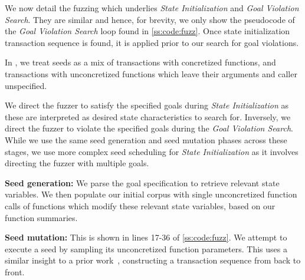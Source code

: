 We now detail the fuzzing  which underlies \textit{State Initialization} and \textit{Goal Violation Search}.
They are similar and hence, for brevity, we only show 
the pseudocode of the \textit{Goal Violation Search} loop found in \autoref{ss:code:fuzz}.
Once state initialization transaction sequence is found, it is applied prior to our search for goal violations.

In \spoilsport, we treat seeds as a mix of transactions with concretized functions, and transactions with 
unconcretized functions which leave their arguments and caller unspecified.

We direct the fuzzer to satisfy the specified goals during \textit{State Initialization} as these are interpreted as desired state characteristics to search for.
Inversely, we direct the fuzzer to violate the specified goals during the \textit{Goal Violation Search}.
While we use the same seed generation and seed mutation phases across these stages, we use more complex seed scheduling for \textit{State Initialization} 
as it involves directing the fuzzer with multiple goals.

\smallskip
\noindent
\textbf{Seed generation:}
We parse the goal specification to retrieve relevant state variables.
We then populate our initial corpus with single unconcretized function calls of functions which modify these relevant state variables, based on our function summaries.

\smallskip
\noindent
\textbf{Seed mutation:}
This is shown in lines 17-36 of \autoref{ss:code:fuzz}.
We attempt to execute a seed by sampling its unconcretized function parameters. 
This uses a similar insight to a prior work~\cite{ethploit}, constructing a transaction sequence from back to front.

